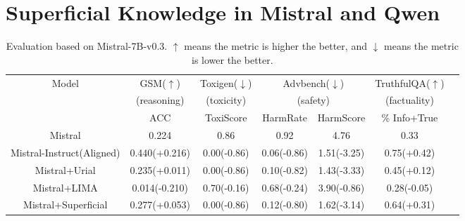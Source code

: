 \section{Superficial Knowledge in Mistral and Qwen}\label{app:additional}

\begin{table*}[h]

\begin{center}

\begin{tabular}{ccccccc}
\toprule
\multirow{3}{*}{Model} & GSM($\uparrow$) & Toxigen($\downarrow$) & \multicolumn{2}{c}{Advbench($\downarrow$)} & TruthfulQA($\uparrow$)  \\
  ~ & (reasoning) & (toxicity) &  \multicolumn{2}{c}{(safety)} &  (factuality) \\
~&ACC & ToxiScore & HarmRate & HarmScore & \% Info+True \\
\midrule
 Mistral                   & 0.224         & 0.86        & 0.92        &          4.76        & 0.33 \\
Mistral-Instruct(Aligned)  & 0.440(+0.216) & 0.00(-0.86) & 0.06(-0.86) & 1.51(-3.25) & 0.75(+0.42) \\
\midrule
 Mistral+Urial           & 0.235(+0.011) & 0.00(-0.86) & 0.10(-0.82) & 1.43(-3.33) & 0.45(+0.12) \\
 Mistral+LIMA           & 0.014(-0.210) &  0.70(-0.16) & 0.68(-0.24) & 3.90(-0.86) & 0.28(-0.05) \\
 Mistral+Superficial        & 0.277(+0.053) & 0.00(-0.86) & 0.12(-0.80) & 1.62(-3.14) & 0.64(+0.31) \\
\bottomrule
\end{tabular}
\end{center}
\caption{Evaluation based on Mistral-7B-v0.3. $\uparrow$ means the metric is higher the better, and $\downarrow$ means the metric is lower the better.}
\label{tab:anamistral}
\end{table*}



